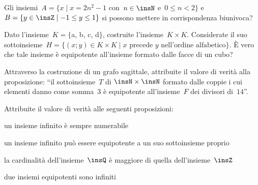 \begin{esercizio}
\label{ese:E.12}
Gli insiemi~$A=\{x\mid x=2n^{2}-1$ con~$n\in \insN$ e~$0\le n<2\}$ e~$B=\{y\in \insZ\mid -1\le y\le 1\}$
si possono mettere in corrispondenza biunivoca?
\end{esercizio}

\begin{esercizio}
\label{ese:E.13}
Dato l'insieme~$K=\{$a, b, c, d$\}$, costruite l'insieme~$K\times K$.
Considerate il suo sottoinsieme~$H=\{(x;y)\in K\times K \mid x\text{ precede }y\text{ nell'ordine alfabetico}\}$.
\`E vero che tale insieme è equipotente all'insieme formato dalle facce di un cubo?
\end{esercizio}

\begin{esercizio}
\label{ese:E.14}
Attraverso la costruzione di un grafo sagittale, attribuite il valore di verità alla proposizione: ``il sottoinsieme~$T$ di
$\insN\times \insN$ formato dalle coppie i cui elementi danno come somma~$3$ è equipotente all'insieme~$F$ dei divisori di~$14$''.
\end{esercizio}

\begin{esercizio}
\label{ese:E.15}
\TabPositions{12cm}
Attribuite il valore di verità alle seguenti proposizioni:
 \begin{enumeratea}
\item un insieme infinito è sempre numerabile \tab\boxV\quad\boxF
\item un insieme infinito può essere equipotente a un suo sottoinsieme proprio \tab\boxV\quad\boxF
\item la cardinalità dell'insieme~$\insQ$ è maggiore di quella dell'insieme~$\insZ$ \tab\boxV\quad\boxF
\item due insiemi equipotenti sono infiniti \tab\boxV\quad\boxF
\end{enumeratea}
\end{esercizio}

